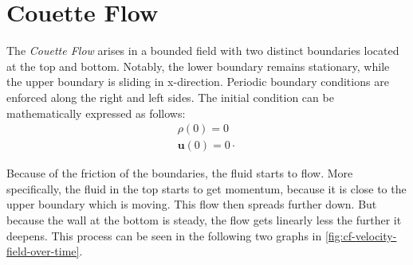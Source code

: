 \section{Couette Flow}\label{sec:couette-flow}
The \textit{Couette Flow} arises in a bounded field with two distinct boundaries located at the top and bottom.
Notably, the lower boundary remains stationary, while the upper boundary is sliding in x-direction.
Periodic boundary conditions are enforced along the right and left sides.
The initial condition can be mathematically expressed as follows:
\begin{equation*}
    \begin{gathered}
        \rho(0) = 0 \\
        \mathbf{u}(0) = 0 \cdot
    \end{gathered}
\end{equation*}

Because of the friction of the boundaries, the fluid starts to flow.
More specifically, the fluid in the top starts to get momentum, because it is close to the upper boundary which is moving.
This flow then spreads further down.
But because the wall at the bottom is steady, the flow gets linearly less the further it deepens.
This process can be seen in the following two graphs in \cref{fig:cf-velocity-field-over-time}.


